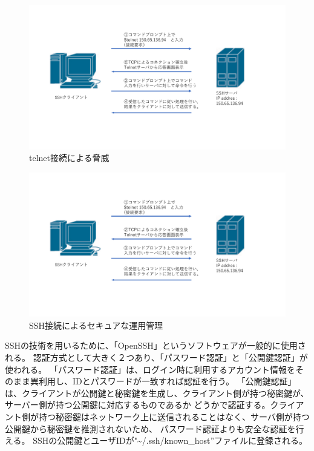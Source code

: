 \documentclass[11pt,a4j,titlepage]{jreport}
\begin{document}
\begin{figure}[h]
    \centering
    \includegraphics[width=1.0\textwidth, page=3]{graphs/network_archtecture.pdf}
    \caption{telnet接続による脅威}
    \label{telnet_flow}
\end{figure}
\begin{figure}[h]
    \centering
    \includegraphics[width=1.0\textwidth, page=4]{graphs/network_archtecture.pdf}
    \caption{SSH接続によるセキュアな運用管理}
    \label{SSH_security}
\end{figure}


\afterpage{\clearpage}
\newpage

SSHの技術を用いるために、「OpenSSH」というソフトウェアが一般的に使用される。
認証方式として大きく２つあり、「パスワード認証」と「公開鍵認証」が使われる。
「パスワード認証」は、ログイン時に利用するアカウント情報をそのまま異利用し、IDとパスワードが一致すれば認証を行う。
「公開鍵認証」は、クライアントが公開鍵と秘密鍵を生成し、クライアント側が持つ秘密鍵が、サーバー側が持つ公開鍵に対応するものであるか
どうかで認証する。クライアント側が持つ秘密鍵はネットワーク上に送信されることはなく、サーバ側が持つ公開鍵から秘密鍵を推測されないため、
パスワード認証よりも安全な認証を行える。
SSHの公開鍵とユーザIDが"\textasciitilde/.ssh/known\_host''ファイルに登録される。
\end{document}
